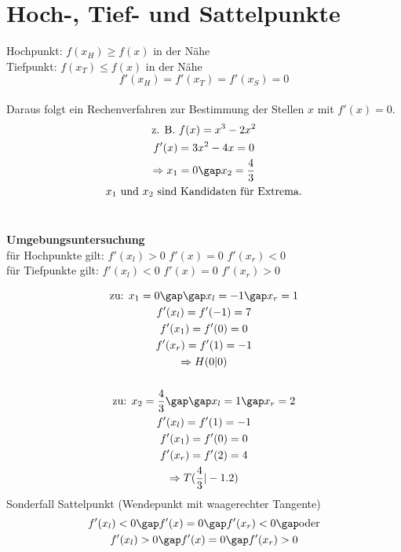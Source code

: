 \section{Hoch-, Tief- und Sattelpunkte}
Hochpunkt: $f(x_H) \geq f(x)$ in der Nähe \\
Tiefpunkt: $f(x_T) \leq f(x)$ in der Nähe \\
$$f'(x_H) = f'(x_T) = f'(x_S) = 0$$ \\
Daraus folgt ein Rechenverfahren zur Bestimmung der Stellen $x$ mit $f'(x) = 0$.
\begin{gather*}
  \text{z. B. } f(x) = x^3 - 2x^2 \\
  f'(x) = 3x^2 - 4x = 0 \\
  \Rightarrow x_1 = 0 \gap x_2 = \frac{4}{3} \\
  x_1 \text{ und } x_2 \text{ sind Kandidaten für Extrema.}
\end{gather*} \\
\begin{onepage}
  \textbf{Umgebungsuntersuchung} \\
  für Hochpunkte gilt: $f'(x_l) > 0$ $f'(x) = 0$ $f'(x_r) < 0$ \\
  für Tiefpunkte gilt: $f'(x_l) < 0$ $f'(x) = 0$ $f'(x_r) > 0$
\end{onepage}
\begin{gather*}
  \text{zu: } x_1 = 0 \gap\gap x_l = -1 \gap x_r = 1 \\
  f'(x_l) = f'(-1) = 7 \\
  f'(x_1) = f'(0) = 0 \\
  f'(x_r) = f'(1) = -1 \\
  \Rightarrow H(0|0) \\\\
  \text{zu: } x_2 = \frac{4}{3} \gap\gap x_l = 1 \gap x_r = 2 \\
  f'(x_l) = f'(1) = -1 \\
  f'(x_1) = f'(0) = 0 \\
  f'(x_r) = f'(2) = 4 \\
  \Rightarrow T(\frac{4}{3}|-1.2)
\end{gather*}
Sonderfall Sattelpunkt (Wendepunkt mit waagerechter Tangente)
\begin{gather*}
  f'(x_l) < 0 \gap f'(x) = 0 \gap f'(x_r) < 0 \gap \text{oder} \\
  f'(x_l) > 0 \gap f'(x) = 0 \gap f'(x_r) > 0
\end{gather*}
